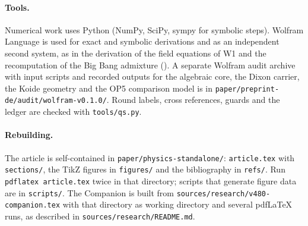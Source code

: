\paragraph{Tools.} Numerical work uses Python (NumPy, SciPy, sympy for symbolic steps). Wolfram Language is used for exact
and symbolic derivations and as an independent second system, as in the derivation of the field equations of W1 and the
recomputation of the Big Bang admixture (). A separate Wolfram audit archive with input scripts and recorded
outputs for the algebraic core, the Dixon carrier, the Koide geometry and the OP5 comparison model is in
\nolinkurl{paper/preprint-de/audit/wolfram-v0.1.0/}. Round labels, cross references, guards and the ledger are checked with
\nolinkurl{tools/qs.py}.

\paragraph{Rebuilding.} The article is self-contained in \nolinkurl{paper/physics-standalone/}: \texttt{article.tex} with
\nolinkurl{sections/}, the TikZ figures in \nolinkurl{figures/} and the bibliography in \nolinkurl{refs/}. Run \texttt{pdflatex
article.tex} twice in that directory; scripts that generate figure data are in \nolinkurl{scripts/}. The Companion is built
from \nolinkurl{sources/research/v480-companion.tex} with that directory as working directory and several pdfLaTeX runs, as
described in \nolinkurl{sources/research/README.md}.
